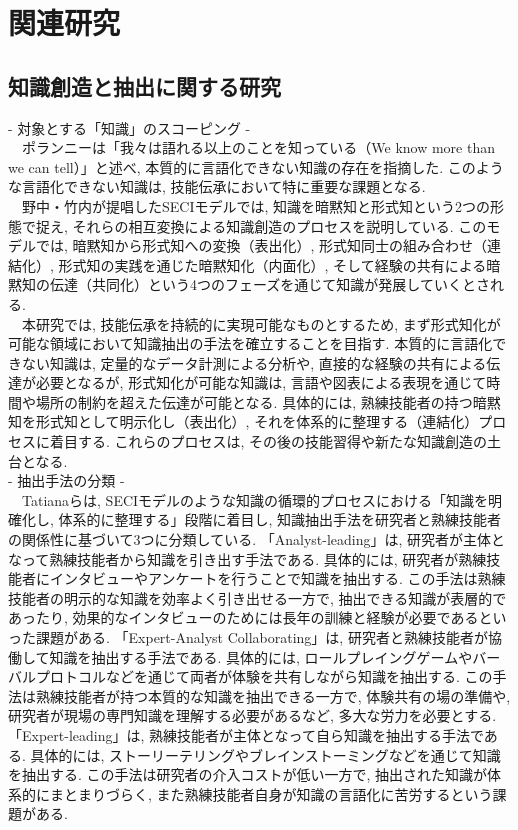 \chapter{関連研究}
\section{知識創造と抽出に関する研究}
- 対象とする「知識」のスコーピング -\\
　ポランニーは「我々は語れる以上のことを知っている（We know more than we can tell）」と述べ, 本質的に言語化できない知識の存在を指摘した\cite{Polanyi1966}. このような言語化できない知識は, 技能伝承において特に重要な課題となる. \\
　野中・竹内が提唱したSECIモデルでは, 知識を暗黙知と形式知という2つの形態で捉え, それらの相互変換による知識創造のプロセスを説明している\cite{Nonaka1996}. このモデルでは, 暗黙知から形式知への変換（表出化）, 形式知同士の組み合わせ（連結化）, 形式知の実践を通じた暗黙知化（内面化）, そして経験の共有による暗黙知の伝達（共同化）という4つのフェーズを通じて知識が発展していくとされる.\\
　本研究では, 技能伝承を持続的に実現可能なものとするため, まず形式知化が可能な領域において知識抽出の手法を確立することを目指す. 本質的に言語化できない知識は, 定量的なデータ計測による分析や, 直接的な経験の共有による伝達が必要となるが, 形式知化が可能な知識は, 言語や図表による表現を通じて時間や場所の制約を超えた伝達が可能となる. 具体的には, 熟練技能者の持つ暗黙知を形式知として明示化し（表出化）, それを体系的に整理する（連結化）プロセスに着目する. これらのプロセスは, その後の技能習得や新たな知識創造の土台となる.\\

- 抽出手法の分類 -\\
　Tatianaらは, SECIモデルのような知識の循環的プロセスにおける「知識を明確化し, 体系的に整理する」段階に着目し, 知識抽出手法を研究者と熟練技能者の関係性に基づいて3つに分類している\cite{Tatiana2012}. 「Analyst-leading」は, 研究者が主体となって熟練技能者から知識を引き出す手法である. 具体的には, 研究者が熟練技能者にインタビューやアンケートを行うことで知識を抽出する. この手法は熟練技能者の明示的な知識を効率よく引き出せる一方で, 抽出できる知識が表層的であったり, 効果的なインタビューのためには長年の訓練と経験が必要であるといった課題がある. 「Expert-Analyst Collaborating」は, 研究者と熟練技能者が協働して知識を抽出する手法である. 具体的には, ロールプレイングゲームやバーバルプロトコルなどを通じて両者が体験を共有しながら知識を抽出する. この手法は熟練技能者が持つ本質的な知識を抽出できる一方で, 体験共有の場の準備や, 研究者が現場の専門知識を理解する必要があるなど, 多大な労力を必要とする. 「Expert-leading」は, 熟練技能者が主体となって自ら知識を抽出する手法である. 具体的には, ストーリーテリングやブレインストーミングなどを通じて知識を抽出する. この手法は研究者の介入コストが低い一方で, 抽出された知識が体系的にまとまりづらく, また熟練技能者自身が知識の言語化に苦労するという課題がある.\\

